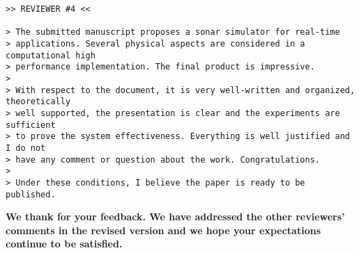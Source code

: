 \documentclass{article}
\begin{document}
\begin{verbatim}
>> REVIEWER #4 <<

> The submitted manuscript proposes a sonar simulator for real-time
> applications. Several physical aspects are considered in a computational high
> performance implementation. The final product is impressive.
>
> With respect to the document, it is very well-written and organized, theoretically
> well supported, the presentation is clear and the experiments are sufficient
> to prove the system effectiveness. Everything is well justified and I do not
> have any comment or question about the work. Congratulations.
>
> Under these conditions, I believe the paper is ready to be published.
\end{verbatim}

\textbf{We thank for your feedback. We have addressed the other reviewers' comments in the revised
version and we hope your expectations continue to be satisfied.}
\end{document}
